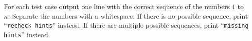 \begin{Output}
    For each test case output one line with the correct sequence of the numbers $1$ to $n$.
    Separate the numbers with a whitespace.
    If there is no possible sequence, print ``\texttt{recheck hints}'' instead.
    If there are multiple possible sequences, print ``\texttt{missing hints}'' instead.
\end{Output}
